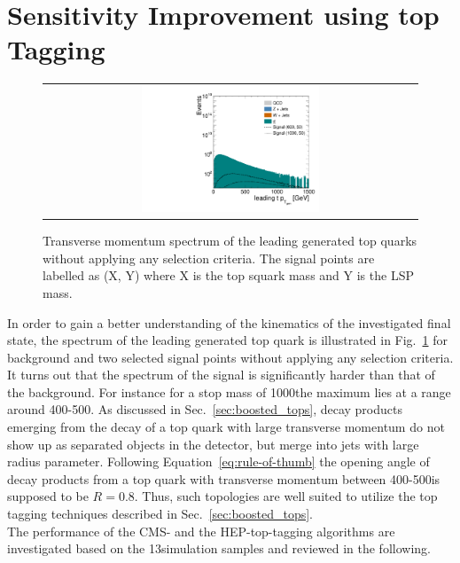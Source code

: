 \section{Sensitivity Improvement using top Tagging}
\label{sec:stop_btagging}
\begin{figure}[!t]
  \centering
  \begin{tabular}{c}
                \includegraphics[width=0.49\textwidth]{figures/Stop_NoCuts_leading_t_ptgen.pdf} 
  \end{tabular}
  \caption{Transverse momentum spectrum of the leading generated top quarks without applying any selection criteria. The signal points are labelled as (X, Y) where X is the top squark mass and Y is the LSP mass.}
  \label{fig:stop_gen_top_pt}
\end{figure} 
In order to gain a better understanding of the kinematics of the investigated final state, the \pt spectrum of the leading generated top quark is illustrated in Fig.~\ref{fig:stop_gen_top_pt} for \ttbar background and two selected signal points without applying any selection criteria. It turns out that the \pt spectrum of the signal is significantly harder than that of the \ttbar background. For instance for a stop mass of 1000\gev the maximum lies at a \pt range around 400-500\gev. As discussed in Sec.~\ref{sec:boosted_tops}, decay products emerging from the decay of a top quark with large transverse momentum do not show up as separated objects in the detector, but merge into jets with large radius parameter. Following Equation~\ref{eq:rule-of-thumb} the opening angle of decay products from a top quark with transverse momentum between 400-500\gev is supposed to be $R = 0.8$. Thus, such topologies are well suited to utilize the top tagging techniques described in Sec.~\ref{sec:boosted_tops}. \\
The performance of the CMS- and the HEP-top-tagging algorithms are investigated based on the 13\tev simulation samples and reviewed in the following. 
